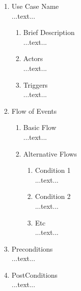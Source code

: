 \documentclass[a4paper,11pt]{article}
\begin{document}
\renewcommand{\theenumiii}{\arabic{enumiii}.}
\renewcommand{\labelenumiii}{\theenumiii}


\begin{enumerate}

 \item Use Case Name \\
...text...

\begin{enumerate}

\item Brief Description \\
...text...
\item Actors \\
...text...
\item Triggers \\
...text...

\end{enumerate} 

\item Flow of Events \\

\begin{enumerate}

\item Basic Flow \\
...text...
\item Alternative Flows \\

\begin{enumerate}

\item Condition 1 \\
...text...
\item Condition 2 \\
...text...
\item Etc \\
...text...

\end{enumerate}
\end{enumerate} 

\item Preconditions \\
...text...

\item PostConditions \\
...text...

\end{enumerate}
\end{document}
